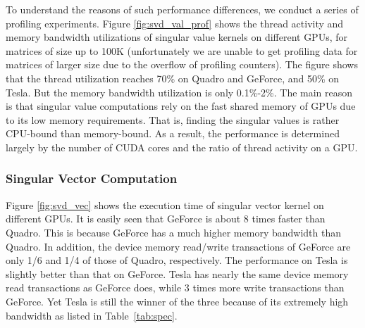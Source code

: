 To understand the reasons
of such performance differences, we conduct a series of profiling experiments.
Figure \ref{fig:svd_val_prof} shows the thread activity and memory bandwidth utilizations of singular value kernels on different GPUs, for matrices of size up to 
100K (unfortunately we are unable to get profiling data for matrices of larger size due to the overflow of profiling counters). 
The figure shows that the thread utilization reaches 70\% on Quadro and GeForce, and 50\% on Tesla. 
But the memory bandwidth utilization is only 0.1\%-2\%.
The main reason is that singular value computations rely on the fast shared memory
of GPUs due to its low memory requirements. That is, finding the singular
values is rather CPU-bound than memory-bound. 
As a result, the performance is determined largely by the number of CUDA cores and the ratio of thread activity on a GPU.

\subsubsection{Singular Vector Computation}
Figure \ref{fig:svd_vec} shows the execution time of singular vector kernel on different GPUs. 
It is easily seen that GeForce is about 8 times faster than
Quadro. This is because GeForce has a much higher memory bandwidth
than Quadro.
In addition, the device memory read/write transactions of GeForce are only 1/6 and 1/4 of those of Quadro, respectively.
The performance on Tesla is slightly better than that on GeForce.
Tesla has nearly the same device memory read transactions as GeForce does, while 3 times more write transactions than GeForce.
Yet Tesla is still the winner of the three because of its extremely high
bandwidth as listed in Table~\ref{tab:spec}.

